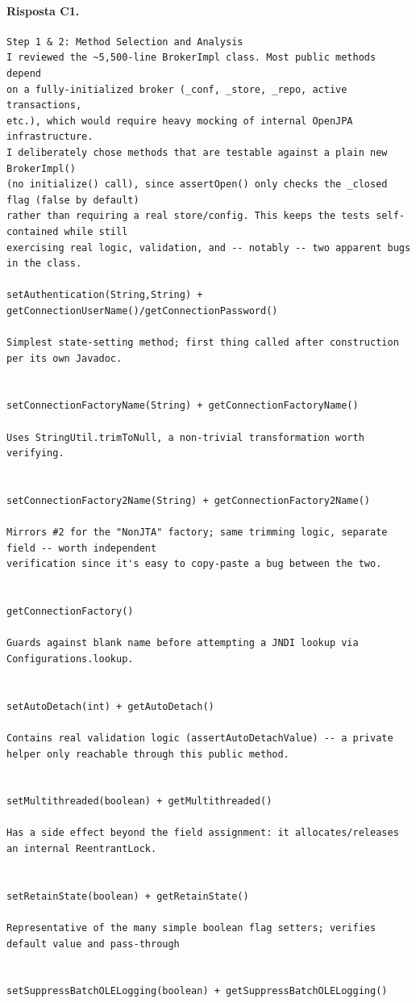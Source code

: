 \paragraph*{Risposta C1.}
\label{risposta:c1}
\begin{lstlisting}
Step 1 & 2: Method Selection and Analysis
I reviewed the ~5,500-line BrokerImpl class. Most public methods depend
on a fully-initialized broker (_conf, _store, _repo, active transactions,
etc.), which would require heavy mocking of internal OpenJPA infrastructure.
I deliberately chose methods that are testable against a plain new BrokerImpl()
(no initialize() call), since assertOpen() only checks the _closed flag (false by default)
rather than requiring a real store/config. This keeps the tests self-contained while still
exercising real logic, validation, and -- notably -- two apparent bugs in the class.

setAuthentication(String,String) + getConnectionUserName()/getConnectionPassword()

Simplest state-setting method; first thing called after construction per its own Javadoc.


setConnectionFactoryName(String) + getConnectionFactoryName()

Uses StringUtil.trimToNull, a non-trivial transformation worth verifying.


setConnectionFactory2Name(String) + getConnectionFactory2Name()

Mirrors #2 for the "NonJTA" factory; same trimming logic, separate field -- worth independent
verification since it's easy to copy-paste a bug between the two.


getConnectionFactory()

Guards against blank name before attempting a JNDI lookup via Configurations.lookup.


setAutoDetach(int) + getAutoDetach()

Contains real validation logic (assertAutoDetachValue) -- a private helper only reachable through this public method.


setMultithreaded(boolean) + getMultithreaded()

Has a side effect beyond the field assignment: it allocates/releases an internal ReentrantLock.


setRetainState(boolean) + getRetainState()

Representative of the many simple boolean flag setters; verifies default value and pass-through


setSuppressBatchOLELogging(boolean) + getSuppressBatchOLELogging()


\end{lstlisting}
